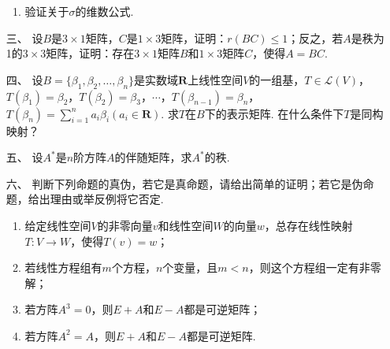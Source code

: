 \begin{enumerate}
\begin{enumerate}[label=(\arabic*)]
        \item 验证关于$\sigma$的维数公式.
    \end{enumerate}
	\item[三、]设$B$是$3\times 1$矩阵，$C$是$1\times 3$矩阵，证明：$r(BC)\leqslant 1$；反之，若$A$是秩为1的$3\times 3$矩阵，证明：存在$3\times 1$矩阵$B$和$1\times 3$矩阵$C$，使得$A=BC$.
	\item[四、]设$B=\{\beta_1,\beta_2,\ldots,\beta_n\}$是实数域$\mathbf{R}$上线性空间$V$的一组基，$T\in\mathcal{L}(V)$，$T(\beta_1)=\beta_2$，$T(\beta_2)=\beta_3$，$\cdots$，$T(\beta_{n-1})=\beta_n$，$T(\beta_n)=\sum\limits_{i=1}^{n}a_i\beta_i(a_i\in\mathbf{R})$. 求$T$在$B$下的表示矩阵. 在什么条件下$T$是同构映射？
	\item[五、]设$A^*$是$n$阶方阵$A$的伴随矩阵，求$A^*$的秩.
	\item[六、]判断下列命题的真伪，若它是真命题，请给出简单的证明；若它是伪命题，给出理由或举反例将它否定.
	\begin{enumerate}[label=(\arabic*)]
        \item 给定线性空间$V$的非零向量$v$和线性空间$W$的向量$w$，总存在线性映射$T:V\to W$，使得$T(v)=w$；

        \item 若线性方程组有$m$个方程，$n$个变量，且$m<n$，则这个方程组一定有非零解；

        \item 若方阵$A^3=0$，则$E+A$和$E-A$都是可逆矩阵；

        \item 若方阵$A^2=A$，则$E+A$和$E-A$都是可逆矩阵.
    \end{enumerate}
\end{enumerate}

\clearpage
